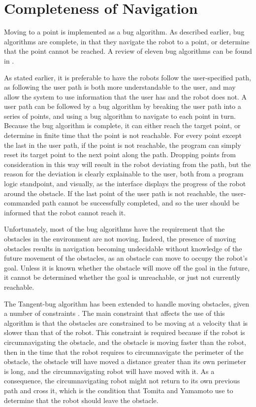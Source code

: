 \section{Completeness of Navigation}

Moving to a point is implemented as a bug algorithm. As described earlier, bug algorithms are complete, in that they navigate the robot to a point, or determine that the point cannot be reached. A review of eleven bug algorithms can be found in \citep{ng2007performance}. 

As stated earlier, it is preferable to have the robots follow the user-specified path, as following the user path is both more understandable to the user, and may allow the system to use information that the user has and the robot does not. 
A user path can be followed by a bug algorithm by breaking the user path into a series of points, and using a bug algorithm to navigate to each point in turn. 
Because the bug algorithm is complete, it can either reach the target point, or determine in finite time that the point is not reachable. 
For every point except the last in the user path, if the point is not reachable, the program can simply reset its target point to the next point along the path. 
Dropping points from consideration in this way will result in the robot deviating from the path, but the reason for the deviation is clearly explainable to the user, both from a program logic standpoint, and visually, as the interface displays the progress of the robot around the obstacle. 
If the last point of the user path is not reachable, the user-commanded path cannot be successfully completed, and so the user should be informed that the robot cannot reach it. 

Unfortunately, most of the bug algorithms have the requirement that the obstacles in the environment are not moving.
Indeed, the presence of moving obstacles results in navigation becoming undecidable without knowledge of the future movement of the obstacles, as an obstacle can move to occupy the robot's goal. 
Unless it is known whether the obstacle will move off the goal in the future, it cannot be determined whether the goal is unreachable, or just not currently reachable. 

The Tangent-bug algorithm has been extended to handle moving obstacles, given a number of constraints \citep{kamon1998tangentbug, tomita2009sensor}.
The main constraint that affects the use of this algorithm is that the obstacles are constrained to be moving at a velocity that is slower than that of the robot.
This constraint is required because if the robot is circumnavigating the obstacle, and the obstacle is moving faster than the robot, then in the time that the robot requires to circumnavigate the perimeter of the obstacle, the obstacle will have moved a distance greater than its own perimeter is long, and the circumnavigating robot will have moved with it.
As a consequence, the circumnavigating robot might not return to its own previous path and cross it, which is the condition that Tomita and Yamamoto use to determine that the robot should leave the obstacle. 

